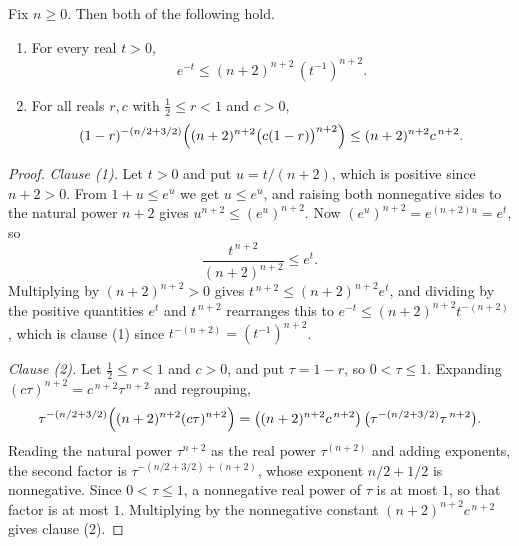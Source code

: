 \begin{lemma}
Fix $n \geq 0$.  Then both of the following hold.
\begin{enumerate}
  \item For every real $t > 0$,
    \[
      e^{-t} \leq (n+2)^{n+2}\,(t^{-1})^{n+2} .
    \]
  \item For all reals $r,c$ with $\tfrac12 \leq r < 1$ and $c > 0$,
    \[
      (1-r)^{-(n/2+3/2)}\Bigl((n+2)^{n+2}\bigl(c(1-r)\bigr)^{n+2}\Bigr)
        \leq (n+2)^{n+2}c^{\,n+2} .
    \]
\end{enumerate}
\end{lemma}
\begin{proof}
\emph{Clause (1).}
Let $t > 0$ and put $u = t/(n+2)$, which is positive since $n+2 > 0$.  From
$1+u \leq e^u$ we get $u \leq e^u$, and raising both nonnegative sides to the
natural power $n+2$ gives $u^{n+2} \leq (e^u)^{n+2}$.  Now
$(e^u)^{n+2} = e^{(n+2)u} = e^t$, so
\[
  \frac{t^{\,n+2}}{(n+2)^{n+2}} \leq e^t .
\]
Multiplying by $(n+2)^{n+2} > 0$ gives $t^{\,n+2} \leq (n+2)^{n+2}e^t$, and
dividing by the positive quantities $e^t$ and $t^{\,n+2}$ rearranges this to
$e^{-t} \leq (n+2)^{n+2}t^{-(n+2)}$, which is clause (1) since
$t^{-(n+2)} = (t^{-1})^{n+2}$.

\emph{Clause (2).}
Let $\tfrac12 \leq r < 1$ and $c > 0$, and put $\tau = 1-r$, so $0 < \tau \leq 1$.
Expanding $(c\tau)^{n+2} = c^{\,n+2}\tau^{\,n+2}$ and regrouping,
\[
  \tau^{-(n/2+3/2)}\Bigl((n+2)^{n+2}(c\tau)^{n+2}\Bigr)
    = \bigl((n+2)^{n+2}c^{\,n+2}\bigr)\,
      \bigl(\tau^{-(n/2+3/2)}\tau^{\,n+2}\bigr) .
\]
Reading the natural power $\tau^{n+2}$ as the real power $\tau^{(n+2)}$ and
adding exponents, the second factor is
$\tau^{-(n/2+3/2)+(n+2)}$, whose exponent $n/2 + 1/2$ is nonnegative.  Since
$0 < \tau \leq 1$, a nonnegative real power of $\tau$ is at most $1$, so that
factor is at most $1$.  Multiplying by the nonnegative constant
$(n+2)^{n+2}c^{\,n+2}$ gives clause (2).
\end{proof}
